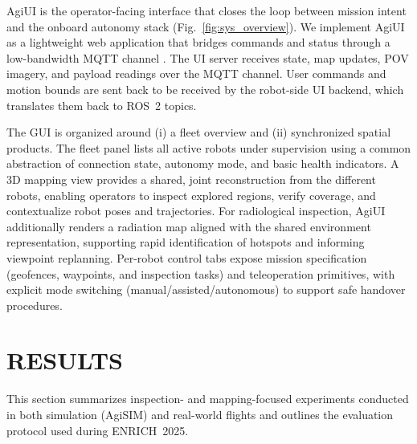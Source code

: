 \documentclass[letterpaper, 10 pt, conference]{ieeeconf}  %
\newcommand{\Agisim}{AgiSIM}
\newcommand{\Agiuis}{AgiUI }
\begin{document}
\Agiuis is the operator-facing interface that closes the loop between mission intent and the onboard autonomy stack (Fig.~\ref{fig:sys_overview}). We implement \Agiuis as a lightweight web application that bridges commands and status through a low-bandwidth MQTT channel \cite{Hu2021CloudStation}. The UI server receives state, map updates, POV imagery, and payload readings over the MQTT channel. User commands and motion bounds are sent back to be received by the robot-side UI backend, which translates them back to ROS~2 topics.

The GUI is organized around (i) a fleet overview and (ii) synchronized spatial products. The fleet panel lists all active robots under supervision using a common abstraction of connection state, autonomy mode, and basic health indicators. A 3D mapping view provides a shared, joint reconstruction from the different robots, enabling operators to inspect explored regions, verify coverage, and contextualize robot poses and trajectories. For radiological inspection, \Agiuis additionally renders a radiation map aligned with the shared environment representation, supporting rapid identification of hotspots and informing viewpoint replanning. Per-robot control tabs expose mission specification (geofences, waypoints, and inspection tasks) and teleoperation primitives, with explicit mode switching (manual/assisted/autonomous) to support safe handover procedures. 









\section{RESULTS}\label{sec:results}
This section summarizes inspection- and mapping-focused experiments conducted in both simulation (\Agisim) and real-world flights and outlines the evaluation protocol used during ENRICH~2025.
\end{document}
